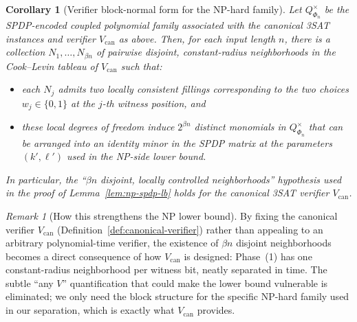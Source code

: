 \documentclass[12pt]{article}
\newtheorem{corollary}[theorem]{Corollary}
\theoremstyle{definition}
\theoremstyle{definition}
\theoremstyle{remark}
\newtheorem{remark}{Remark}
\theoremstyle{remark}
\begin{document}
\begin{corollary}[Verifier block-normal form for the NP-hard family]
\label{cor:block-normal-form}
Let $Q^{\times}_{\Phi_n}$ be the SPDP-encoded coupled polynomial family associated with the
canonical 3SAT instances and verifier $V_{\mathrm{can}}$ as above. Then, for
each input length $n$, there is a collection
$N_1,\dots,N_{\beta n}$ of pairwise disjoint, constant-radius neighborhoods in
the Cook--Levin tableau of $V_{\mathrm{can}}$ such that:
\begin{itemize}
  \item each $N_j$ admits two locally consistent fillings corresponding to
  the two choices $w_j \in \{0,1\}$ at the $j$-th witness position, and
  \item these local degrees of freedom induce $2^{\beta n}$ distinct
  monomials in $Q^{\times}_{\Phi_n}$ that can be arranged into an identity minor in the
  SPDP matrix at the parameters $(k',\ell')$ used in the NP-side lower bound.
\end{itemize}
In particular, the ``$\beta n$ disjoint, locally controlled neighborhoods''
hypothesis used in the proof of Lemma~\ref{lem:np-spdp-lb} holds
for the canonical 3SAT verifier $V_{\mathrm{can}}$.
\end{corollary}

\begin{remark}[How this strengthens the NP lower bound]
By fixing the canonical verifier $V_{\mathrm{can}}$ (Definition~\ref{def:canonical-verifier})
rather than appealing to an arbitrary polynomial-time verifier, the existence of
$\beta n$ disjoint neighborhoods becomes a direct consequence of how $V_{\mathrm{can}}$
is designed: Phase~(1) has one constant-radius neighborhood per witness bit, neatly
separated in time. The subtle ``any $V$'' quantification that could make the lower
bound vulnerable is eliminated; we only need the block structure for the specific
NP-hard family used in our separation, which is exactly what $V_{\mathrm{can}}$ provides.
\end{remark}
\end{document}
